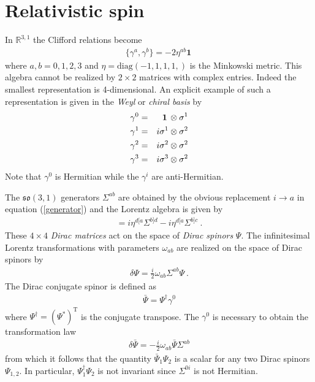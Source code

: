\documentclass[12pt]{article}
\begin{document}
\section{Relativistic spin}
In $\mathbb {R}^{3,1}$ the Clifford relations become 
\begin{eqnarray}
\label{clifford}
\{ \gamma^a, \gamma^b\}=-2\eta^{ab} \mathbf 1~
\end{eqnarray}
where $a,b=0,1,2,3$ and $\eta=\mathrm{diag}(-1,1,1,1,)$ is the Minkowski metric. This algebra cannot be realized by $2\times 2$ matrices with complex entries. Indeed the smallest representation is 4-dimensional. An explicit example of such a representation is given in the {\em Weyl} or {\em chiral basis} by
\begin{eqnarray}
\label{basis}
\gamma^0&=&\mathbf 1\,\otimes \sigma^1\cr
\gamma^1&=&i\sigma^1\otimes \sigma^2\cr
\gamma^2&=&i\sigma^2\otimes \sigma^2\cr
\gamma^3&=&i\sigma^3\otimes \sigma^2
\end{eqnarray}
Note that $\gamma^0$ is Hermitian while the $\gamma^i$ are anti-Hermitian. 

The $\mathfrak{so}(3,1)$ generators $\Sigma^{ab}$ are obtained by the obvious replacement $i\to a$ in equation (\ref{generator}) and the Lorentz algebra is given by
\begin{eqnarray}
[\Sigma^{ab},\Sigma^{cd}]=i \eta^{d[a}\Sigma^{b]d}-i \eta^{d[a}\Sigma^{b]c}~.
\end{eqnarray}
These $4\times 4$ {\em Dirac matrices} act on the space of {\em Dirac spinors} $\Psi$. The infinitesimal Lorentz transformations with parameters $\omega_{ab}$ are realized on the space of Dirac spinors by
\begin{eqnarray}
\delta \Psi= \frac i2 \omega_{ab}\Sigma^{ab} \Psi~.
\end{eqnarray}
The Dirac conjugate spinor is defined as
\begin{eqnarray}
\label{DiracConj}
\bar \Psi=\Psi^\dagger \gamma^0
\end{eqnarray}
where $\Psi^\dagger=(\Psi^*)^\mathrm T$ is the conjugate transpose. The $\gamma^0$ is necessary to obtain the transformation law
\begin{eqnarray}
\delta \bar \Psi=-\frac i2 \omega_{ab} \bar \Psi \Sigma^{ab}
\end{eqnarray}
from which it follows that the quantity $\bar \Psi_1 \Psi_2$ is a scalar for any two Dirac spinors $\Psi_{1,2}$. In particular, $\Psi_1^\dagger \Psi_2$ is not invariant since $\Sigma^{0i}$ is not Hermitian.
\end{document}
